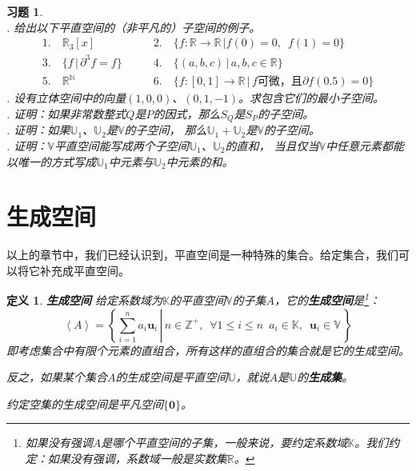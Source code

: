 \documentclass[12pt,UTF8]{ctexbook}
\newcommand{\vect}[1]{\left\langle #1 \right\rangle}
\newtheorem{df}{定义}[section]
\newtheorem{xt}{习题}[section]
\begin{document}
\begin{xt}
    \mbox{} \\
    . 给出以下平直空间的（非平凡的）子空间的例子。\\
    $$
    \begin{array}{ll}
        1. \quad \mathbb{R}_3[x] & \qquad 2. \quad \{f: \mathbb{R} \rightarrow \mathbb{R} \, | f(0) = 0, \,\,\, f(1) = 0\} \\
        3. \quad \{f \, | \, \partial^3 f = f\} & \qquad 4. \quad \{(a, b, c) \, | \, a, b, c \in \mathbb{R}\} \\
        5. \quad \mathbb{R}^\mathbb{N} & \qquad 6. \quad \{f: [0,1] \rightarrow \mathbb{R} \, | \, f \mbox{可微，且} \partial f(0.5) = 0\}
    \end{array}
    $$
    . 设有立体空间中的向量$(1, 0, 0)$、$(0, 1, -1)$。求包含它们的最小子空间。\\
    . 证明：如果非常数整式$Q$是$P$的因式，那么$S_Q$是$S_P$的子空间。\\
    . 证明：如果$\mathbb{U}_1$、$\mathbb{U}_2$是$\mathbb{V}$的子空间，
    那么$\mathbb{U}_1 + \mathbb{U}_2$是$\mathbb{V}$的子空间。\\
    . 证明：$\mathbb{V}$平直空间能写成两个子空间$\mathbb{U}_1$、$\mathbb{U}_2$的直和，
    当且仅当$\mathbb{V}$中任意元素都能以唯一的方式写成$\mathbb{U}_1$中元素与$\mathbb{U}_2$中元素的和。
\end{xt}

\section{生成空间}
以上的章节中，我们已经认识到，平直空间是一种特殊的集合。给定集合，我们可以将它补充成平直空间。
\begin{df}{\textbf{生成空间}}
    给定系数域为$\mathbb{K}$的平直空间$\mathbb{V}$的子集$A$，它的\textbf{生成空间}是\footnote{如果没有强调$A$是哪个平直空间的子集，一般来说，要约定系数域$\mathbb{K}$。我们约定：如果没有强调，系数域一般是实数集$\mathbb{R}$。}：
    $$ \vect{A} = \left\{\left. \sum_{i=1}^n a_i \mathbf{u}_i \, \right| \, n\in\mathbb{Z}^+, \,\,\, \forall 1\leqslant i \leqslant n \,\,\, a_i \in \mathbb{K}, \,\,\, \mathbf{u}_i \in \mathbb{V} \, \right\} $$
    即考虑集合中有限个元素的直组合，所有这样的直组合的集合就是它的生成空间。
    
    反之，如果某个集合$A$的生成空间是平直空间$\mathbb{U}$，就说$A$是$\mathbb{U}$的\textbf{生成集}。

    约定空集的生成空间是平凡空间$\{\mathbf{0}\}$。
\end{df}
\end{document}
